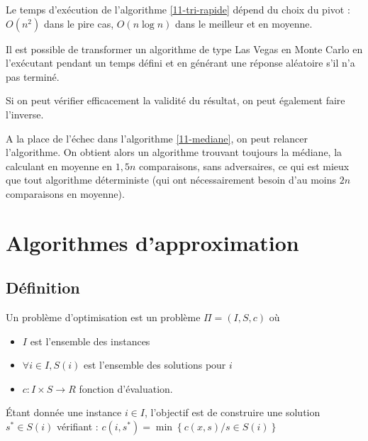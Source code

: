 \begin{rem}
	Le temps d'exécution de l'algorithme \ref{11-tri-rapide} dépend du choix du pivot : $O(n^2)$ dans le pire cas, $O(n\log n)$ dans le meilleur et en moyenne. 
\end{rem}

\begin{rem}
	Il est possible de transformer un algorithme de type Las Vegas en Monte Carlo en l'exécutant pendant un temps défini et en générant une réponse aléatoire s'il n'a pas terminé.
\end{rem}

\begin{rem}
	Si on peut vérifier efficacement la validité du résultat, on peut également faire l'inverse.
\end{rem}

\begin{example}
	A la place de l'échec dans l'algorithme \ref{11-mediane}, on peut relancer l'algorithme. On obtient alors un algorithme trouvant toujours la médiane, la calculant en moyenne en $1,5n$ comparaisons, sans adversaires, ce qui est mieux que tout algorithme déterministe (qui ont nécessairement besoin d'au moins $2n$ comparaisons en moyenne).
\end{example}

\section{Algorithmes d'approximation}

\subsection{Définition}


\begin{definition}
	Un problème d’optimisation est un problème $\Pi = (I, S, c)$ où \begin{itemize}
		\item $I$ est l'ensemble des instances
		\item $\forall i \in I, S(i)$ est l'ensemble des solutions pour $i$
		\item $c : I \times S \to R$ fonction d'évaluation.
	\end{itemize}
	Étant donnée une instance $i \in I$, l’objectif est de construire une solution $s^{*} \in S(i)$ vérifiant : $c(i, s^{*}) = \min\left\{c(x, s) \big/ s \in S(i)\right\}$
\end{definition}

